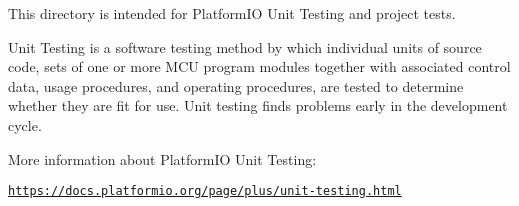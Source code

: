 This directory is intended for Platform\+IO Unit Testing and project tests.

Unit Testing is a software testing method by which individual units of source code, sets of one or more M\+CU program modules together with associated control data, usage procedures, and operating procedures, are tested to determine whether they are fit for use. Unit testing finds problems early in the development cycle.

More information about Platform\+IO Unit Testing\+:
\begin{DoxyItemize}
\item \href{https://docs.platformio.org/page/plus/unit-testing.html}{\tt https\+://docs.\+platformio.\+org/page/plus/unit-\/testing.\+html} 
\end{DoxyItemize}